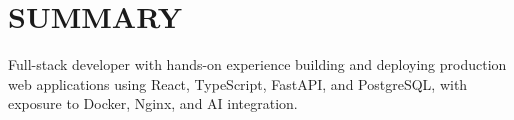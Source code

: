 \section*{SUMMARY}
Full-stack developer with hands-on experience building and deploying production web applications using React, TypeScript, FastAPI, and PostgreSQL, with exposure to Docker, Nginx, and AI integration.
